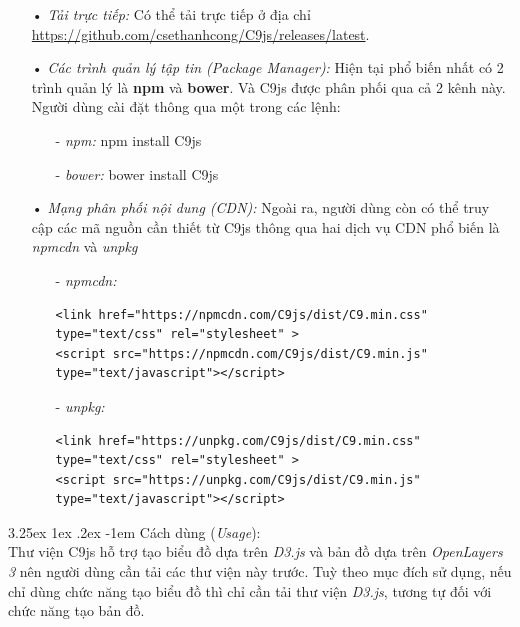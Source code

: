 \documentclass[12pt,a4paper]{article}
\makeatletter
\newcommand{\myparagraph}[1]{\paragraph{#1}\mbox{}\\} %
\renewcommand\paragraph{\@startsection{paragraph}{5}{\z@}%
  {3.25ex \@plus1ex \@minus.2ex}%
  {-1em}%
  {\normalfont\normalsize\bfseries}}
\makeatother
\begin{document}
\begin{itemize}
\item[•] \emph{Tải trực tiếp:} Có thể tải trực tiếp ở địa chỉ \url{https://github.com/csethanhcong/C9js/releases/latest}.

\item[•] \emph{Các trình quản lý tập tin (Package Manager):} Hiện tại phổ biến nhất có 2 trình quản lý là \textbf{npm} và \textbf{bower}. Và C9js được phân phối qua cả 2 kênh này. Người dùng cài đặt thông qua một trong các lệnh:

\begin{itemize}
\item[-] \textit{npm:} \textsf{npm install C9js} 
\item[-] \textit{bower:} \textsf{bower install C9js} 
\end{itemize}

\item[•] \emph{Mạng phân phối nội dung (CDN):} Ngoài ra, người dùng còn có thể truy cập các mã nguồn cần thiết từ C9js thông qua hai dịch vụ CDN phổ biến là \textit{npmcdn} và \textit{unpkg}

\begin{itemize}
\item[-] \emph{npmcdn:} 
	\begin{lstlisting}[caption=Tải mã nguồn thông qua \textit{npmcdn}]
<link href="https://npmcdn.com/C9js/dist/C9.min.css" type="text/css" rel="stylesheet" >
<script src="https://npmcdn.com/C9js/dist/C9.min.js" type="text/javascript"></script>
	\end{lstlisting}

\item[-] \emph{unpkg:}
	\begin{lstlisting}[caption=Tải mã nguồn thông qua \textit{unpkg}]
<link href="https://unpkg.com/C9js/dist/C9.min.css" type="text/css" rel="stylesheet" >
<script src="https://unpkg.com/C9js/dist/C9.min.js" type="text/javascript"></script>
	\end{lstlisting}
\end{itemize}

\end{itemize}

\myparagraph{Cách dùng (\textit{Usage}):}
Thư viện C9js hỗ trợ tạo biểu đồ dựa trên \textit{D3.js} và bản đồ dựa trên \textit{OpenLayers 3} nên người dùng cần tải các thư viện này trước. Tuỳ theo mục đích sử dụng, nếu chỉ dùng chức năng tạo biểu đồ thì chỉ cần tải thư viện \textit{D3.js}, tương tự đối với chức năng tạo bản đồ.
\end{document}
